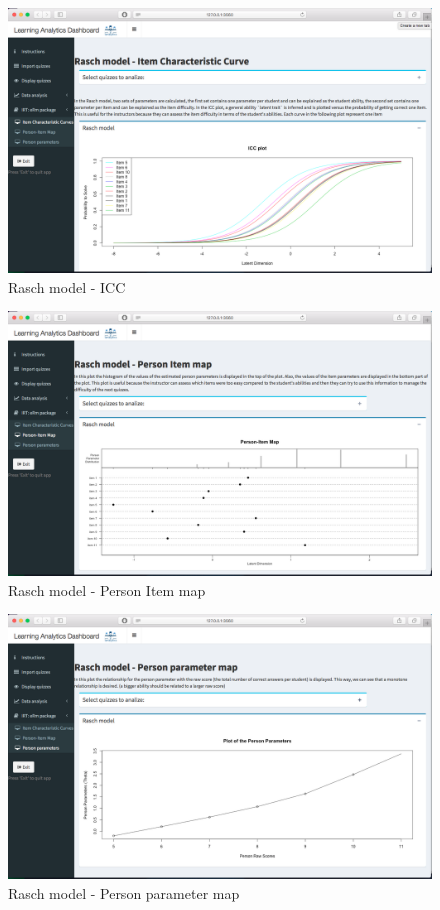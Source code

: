 \begin{figure}[ht!]
\centering
\includegraphics[width=\linewidth]{img/d_7_1.png}
\caption{Rasch model - ICC}
\label{img:d_7_1}
\end{figure}

\begin{figure}[ht!]
\centering
\includegraphics[width=\linewidth]{img/d_7_2.png}
\caption{Rasch model - Person Item map}
\label{img:d_7_2}
\end{figure}
\begin{figure}[ht!]
\centering
\includegraphics[width=\linewidth]{img/d_7_3.png}
\caption{Rasch model - Person parameter map}
\label{img:d_7_3}
\end{figure}

